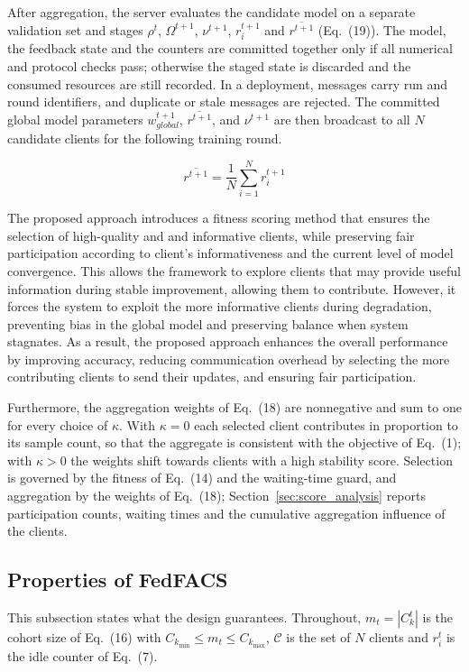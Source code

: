 \documentclass[pdflatex,sn-mathphys-num,oneside]{sn-jnl}%
\theoremstyle{thmstyleone}%
\theoremstyle{thmstyletwo}%
\theoremstyle{thmstylethree}%
\begin{document}
After aggregation, the server evaluates the candidate model on a separate validation set and stages $\rho^t$, $\Omega^{t+1}$, $\nu^{t+1}$, $r_i^{t+1}$ and $\overline{r^{t+1}}$ (Eq.~(19)). The model, the feedback state and the counters are committed together only if all numerical and protocol checks pass; otherwise the staged state is discarded and the consumed resources are still recorded. In a deployment, messages carry run and round identifiers, and duplicate or stale messages are rejected. The committed global model parameters $w_{{global}}^{t+1}$, $\overline{r^{t+1}}$, and $\nu^{t+1}$ are then broadcast to all $N$ candidate clients for the following training round.

\begin{equation}
\overline{r^{t+1}} = \frac{1}{N} \sum_{i=1}^{N} r_i^{t+1}
\label{eq:avg_idle_correct}
\end{equation}

The proposed approach introduces a fitness scoring method that ensures the selection of high-quality and and informative clients, while preserving fair participation according to client’s informativeness and the current level of model convergence. This allows the framework to explore clients that may provide useful information during stable improvement, allowing them to contribute. However, it forces the system to exploit the more informative clients during degradation, preventing bias in the global model and preserving balance when system stagnates. As a result, the proposed approach enhances the overall performance by improving accuracy, reducing communication overhead by selecting the more contributing clients to send their updates, and ensuring fair participation. 

Furthermore, the aggregation weights of Eq.~(18) are nonnegative and sum to one for every choice of $\kappa$. With $\kappa=0$ each selected client contributes in proportion to its sample count, so that the aggregate is consistent with the objective of Eq.~(1); with $\kappa>0$ the weights shift towards clients with a high stability score. Selection is governed by the fitness of Eq.~(14) and the waiting-time guard, and aggregation by the weights of Eq.~(18); Section~\ref{sec:score_analysis} reports participation counts, waiting times and the cumulative aggregation influence of the clients.

\subsection{Properties of FedFACS}\label{sec:properties}
This subsection states what the design guarantees. Throughout, $m_t=|C_k^t|$ is the cohort size of Eq.~(16) with $C_{k_{\min}}\le m_t\le C_{k_{\max}}$, $\mathcal{C}$ is the set of $N$ clients and $r_i^t$ is the idle counter of Eq.~(7).
\end{document}
